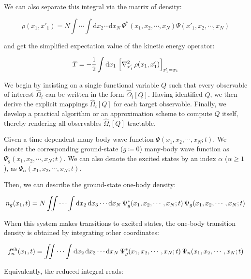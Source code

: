 We can also separate this integral via the matrix of density:

\begin{equation}
    \rho(x_1,x'_1)
    = N\int\cdots\int\mathrm{d}x_2\cdots\mathrm{d}x_N\,\Psi^*(x_1,x_2,\cdots,x_N)\Psi(x'_1,x_2,\cdots,x_N) 
\label{density_matrix}
\end{equation}

and get the simplified expectation value of the kinetic energy operator:

\begin{equation}
    T = -\frac{1}{2}\int\mathrm{d}{x_1}\,\left[\nabla_{x'_1}^{2}\,\rho(x_1,x'_1)\right]_{x'_1=x_1}
\label{kinetic_energy_density_matrix}
\end{equation}

We begin by insisting on a single functional variable $Q$ such that every observable of interest $\hat\Omega_i$ can be written in the form $\hat\Omega_i[Q]$.
Having identified $Q$, we then derive the explicit mappings $\hat\Omega_i[Q]$ for each target observable.
Finally, we develop a practical algorithm or an approximation scheme to compute $Q$ itself, thereby rendering all observables $\hat\Omega_i[Q]$ tractable.

Given a time-dependent many-body wave function $\Psi(x_1,x_2,\cdots,x_N; t)$. 
We denote the corresponding ground-state ($g\coloneqq 0$) many-body wave function as 
$\Psi_g(x_1,x_2,\cdots,x_N; t)$.
We can also denote the excited states by an index $\alpha$ ($\alpha\geq1$), 
as $\Psi_{\alpha}(x_1,x_2,\cdots,x_N; t)$.

Then, we can describe the ground-state one-body density:

\begin{equation}
    n_g(x_1,t)=N\iint\cdots\int\dif{x_2}\,\dif{x_3}\cdots\dif{x_N}\,\Psi_g^*(x_1,x_2,\cdots,x_N;t)\,\Psi_g(x_1,x_2,\cdots,x_N;t) %
\label{ground_one-body_density}
\end{equation}

When this system makes transitions to excited states, the one-body transition density is obtained by integrating other coordinates:

\begin{equation}
    f_n^\mathrm{eh}(x_1,t)=\iint\cdots\int\mathrm{d}{x_2}\,\mathrm{d}{x_3}\cdots\mathrm{d}{x_N}\,\Psi_g^*(x_1,x_2,\cdots,x_N;t)\,\Psi_n(x_1,x_2,\cdots,x_N;t)
\label{transition_one-body}
\end{equation}

Equivalently, the reduced integral reads: 

